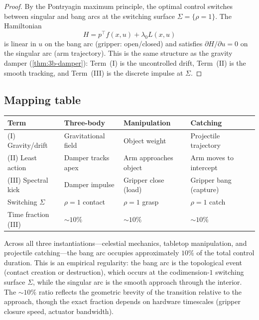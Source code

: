 \begin{proof}
By the Pontryagin maximum principle, the optimal control
switches between singular and bang arcs at the switching surface
$\Sigma = \{\rho = 1\}$.  The Hamiltonian
\[
  H = p^\top f(x,u) + \lambda_0 L(x,u)
\]
is linear in $u$ on the bang arc (gripper: open/closed) and
satisfies $\partial H / \partial u = 0$ on the singular arc
(arm trajectory).  This is the same structure as the gravity
damper (\cref{thm:3b-damper}): Term~(I) is the
uncontrolled drift, Term~(II) is the smooth tracking, and
Term~(III) is the discrete impulse at $\Sigma$.
\end{proof}

\subsection{Mapping table}

\begin{center}
\begin{tabular}{@{}lllll@{}}
\toprule
\textbf{Term} & \textbf{Three-body} & \textbf{Manipulation}
  & \textbf{Catching} \\
\midrule
(I) Gravity/drift
  & Gravitational field
  & Object weight
  & Projectile trajectory \\
(II) Least action
  & Damper tracks apex
  & Arm approaches object
  & Arm moves to intercept \\
(III) Spectral kick
  & Damper impulse
  & Gripper close (load)
  & Gripper bang (capture) \\
Switching $\Sigma$
  & $\rho = 1$ contact
  & $\rho = 1$ grasp
  & $\rho = 1$ catch \\
Time fraction (III)
  & ${\sim}10\%$
  & ${\sim}10\%$
  & ${\sim}10\%$ \\
\bottomrule
\end{tabular}
\end{center}

\begin{remark}
Across all three instantiations---celestial mechanics,
tabletop manipulation, and projectile catching---the bang arc
occupies approximately $10\%$ of the total control duration.
This is an empirical regularity: the bang arc is the
topological event (contact creation or destruction), which
occurs at the codimension-$1$ switching surface $\Sigma$,
while the singular arc is the smooth approach through the
interior.  The ${\sim}10\%$ ratio reflects the geometric
brevity of the transition relative to the approach, though
the exact fraction depends on hardware timescales (gripper
closure speed, actuator bandwidth).
\end{remark}


